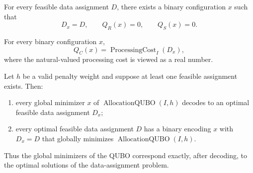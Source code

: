 \begin{lemma}
  \label{lem:feasible-zero-penalty}
For every feasible data assignment $D$, there exists a binary configuration $x$
such that
\[
  D_x=D,\qquad Q_R(x)=0,\qquad Q_S(x)=0.
\]
\end{lemma}

\begin{lemma}
  \label{lem:processing-objectives-agree}
For every binary configuration $x$,
\[
  Q_C(x)=\operatorname{ProcessingCost}_I(D_x),
\]
where the natural-valued processing cost is viewed as a real number.
\end{lemma}

\begin{theorem}
  \label{thm:qubo-encoding-correct}
Let $h$ be a valid penalty weight and suppose at least one feasible assignment
exists. Then:
\begin{enumerate}
  \item every global minimizer $x$ of $\operatorname{AllocationQUBO}(I,h)$
    decodes to an optimal feasible data assignment $D_x$;
  \item every optimal feasible data assignment $D$ has a binary encoding $x$
    with $D_x=D$ that globally minimizes
    $\operatorname{AllocationQUBO}(I,h)$.
\end{enumerate}
Thus the global minimizers of the QUBO correspond exactly, after decoding, to
the optimal solutions of the data-assignment problem.
\end{theorem}

